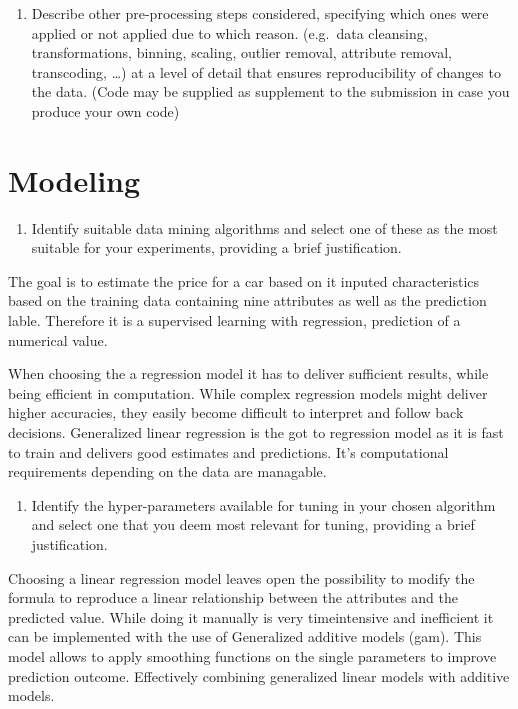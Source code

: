 \documentclass[sigchi]{acmart}
\def\tightlist{}
\begin{document}
\begin{enumerate}
\def\labelenumi{\alph{enumi}.}
\setcounter{enumi}{2}
\tightlist
\item
  Describe other pre-processing steps considered, specifying which ones were applied or not applied due to which reason. (e.g.~data cleansing, transformations, binning, scaling, outlier removal, attribute removal, transcoding, \ldots{}) at a level of detail that ensures reproducibility of changes to the data. (Code may be supplied as supplement to the submission in case you produce your own code)
\end{enumerate}

\hypertarget{modeling}{%
\section{Modeling}\label{modeling}}

\begin{enumerate}
\def\labelenumi{\alph{enumi}.}
\tightlist
\item
  Identify suitable data mining algorithms and select one of these as the most suitable for your experiments, providing a brief justification.
\end{enumerate}

The goal is to estimate the price for a car based on it inputed characteristics based on the training data containing nine attributes as well as the prediction lable. Therefore it is a supervised learning with regression, prediction of a numerical value.

When choosing the a regression model it has to deliver sufficient results, while being efficient in computation.
While complex regression models might deliver higher accuracies, they easily become difficult to interpret and follow back decisions.
Generalized linear regression is the got to regression model as it is fast to train and delivers good estimates and predictions. It's computational requirements depending on the data are managable.

\begin{enumerate}
\def\labelenumi{\alph{enumi}.}
\setcounter{enumi}{1}
\tightlist
\item
  Identify the hyper-parameters available for tuning in your chosen algorithm and select one that you deem most relevant for tuning, providing a brief justification.
\end{enumerate}

Choosing a linear regression model leaves open the possibility to modify the formula to reproduce a linear relationship between the attributes and the predicted value. While doing it manually is very timeintensive and inefficient it can be implemented with the use of Generalized additive models (gam). This model allows to apply smoothing functions on the single parameters to improve prediction outcome. Effectively combining generalized linear models with additive models.
\end{document}
